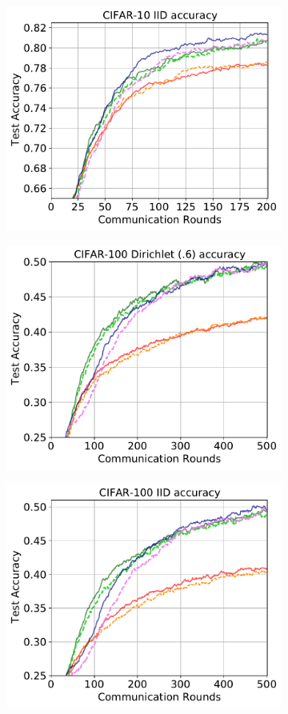 \documentclass{article} %
\begin{document}
\begin{figure}[ht!]
\begin{subfigure}{.5\textwidth}
  \label{fig:sub1-Fifth}
\end{subfigure}
\begin{subfigure}{.5\textwidth}
  \centering
  \includegraphics[width=.8\linewidth]{textfigure/cifar10_iid.pdf}
  \label{fig:sub1-sixth}
\end{subfigure}
\begin{subfigure}{.5\textwidth}
  \centering
  \includegraphics[width=.8\linewidth]{textfigure/cifar100_0.6.pdf}
  \label{fig:sub1-seventh}
\end{subfigure}
\begin{subfigure}{.5\textwidth}
  \centering
  \includegraphics[width=.8\linewidth]{textfigure/cifar100_iid.pdf}

\end{subfigure}
\end{figure}
\end{document}
